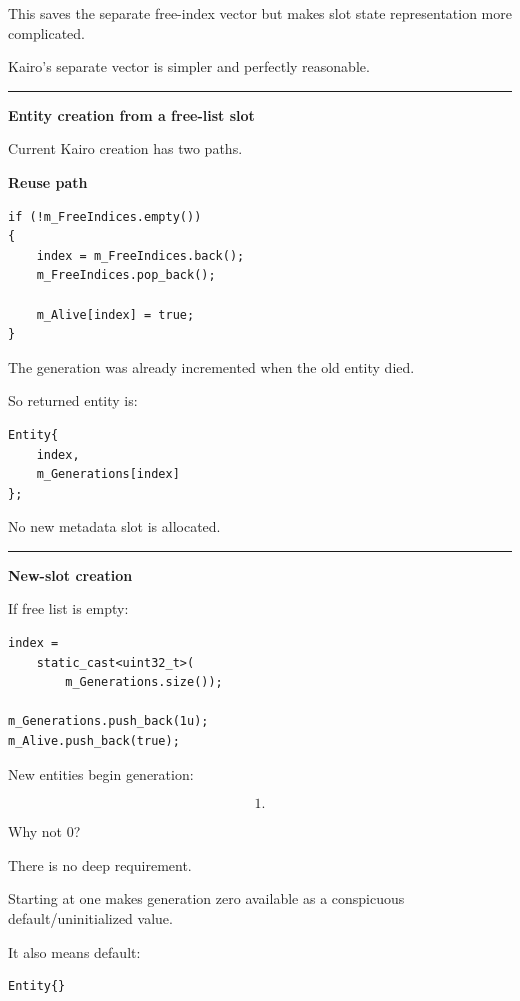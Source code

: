 This saves the separate free-index vector but makes slot state representation more complicated.

Kairo's separate vector is simpler and perfectly reasonable.

\begin{center}\rule{0.5\linewidth}{0.5pt}\end{center}

\textbf{Entity creation from a free-list slot}

Current Kairo creation has two paths.

\textbf{Reuse path}

\begin{verbatim}
if (!m_FreeIndices.empty())
{
    index = m_FreeIndices.back();
    m_FreeIndices.pop_back();

    m_Alive[index] = true;
}
\end{verbatim}

The generation was already incremented when the old entity died.

So returned entity is:

\begin{verbatim}
Entity{
    index,
    m_Generations[index]
};
\end{verbatim}

No new metadata slot is allocated.

\begin{center}\rule{0.5\linewidth}{0.5pt}\end{center}

\textbf{New-slot creation}

If free list is empty:

\begin{verbatim}
index =
    static_cast<uint32_t>(
        m_Generations.size());

m_Generations.push_back(1u);
m_Alive.push_back(true);
\end{verbatim}

New entities begin generation:

\[
1.
\]

Why not 0?

There is no deep requirement.

Starting at one makes generation zero available as a conspicuous default/uninitialized value.

It also means default:

\begin{verbatim}
Entity{}
\end{verbatim}


